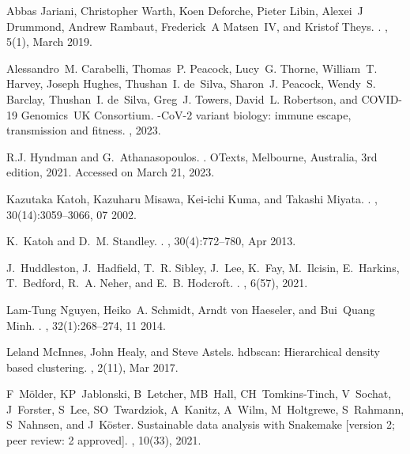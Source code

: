 \documentclass[webpdf,contemporary,large,single]{oup-authoring-template}%
\theoremstyle{thmstyleone}%
\theoremstyle{thmstyletwo}%
\theoremstyle{thmstylethree}%
\begin{document}
\begin{thebibliography}{10}
Abbas Jariani, Christopher Warth, Koen Deforche, Pieter Libin, Alexei~J
  Drummond, Andrew Rambaut, Frederick~A Matsen~IV, and Kristof Theys.
.
, 5(1), March 2019.

Alessandro~M. Carabelli, Thomas~P. Peacock, Lucy~G. Thorne, William~T. Harvey,
  Joseph Hughes, Thushan~I. de~Silva, Sharon~J. Peacock, Wendy~S. Barclay,
  Thushan~I. de~Silva, Greg~J. Towers, David~L. Robertson, and COVID-19
  Genomics~UK Consortium.
-{C}o{V}-2 variant biology: immune escape, transmission and
  fitness.
, 2023.

R.J. Hyndman and G.~Athanasopoulos.
.
\newblock OTexts, Melbourne, Australia, 3rd edition, 2021.
\newblock Accessed on March 21, 2023.

Kazutaka Katoh, Kazuharu Misawa, Kei‐ichi Kuma, and Takashi Miyata.
.
, 30(14):3059--3066, 07 2002.

K.~Katoh and D.~M. Standley.
.
, 30(4):772--780, Apr 2013.

J.~Huddleston, J.~Hadfield, T.~R. Sibley, J.~Lee, K.~Fay, M.~Ilcisin,
  E.~Harkins, T.~Bedford, R.~A. Neher, and E.~B. Hodcroft.
.
, 6(57), 2021.

Lam-Tung Nguyen, Heiko~A. Schmidt, Arndt von Haeseler, and Bui~Quang Minh.
.
, 32(1):268--274, 11 2014.

Leland McInnes, John Healy, and Steve Astels.
\newblock hdbscan: {H}ierarchical density based clustering.
, 2(11), Mar 2017.

F~M\"{o}lder, KP~Jablonski, B~Letcher, MB~Hall, CH~Tomkins-Tinch, V~Sochat,
  J~Forster, S~Lee, SO~Twardziok, A~Kanitz, A~Wilm, M~Holtgrewe, S~Rahmann,
  S~Nahnsen, and J~K\"{o}ster.
\newblock Sustainable data analysis with {Snakemake} [version 2; peer review: 2
  approved].
, 10(33), 2021.

\end{thebibliography}
\end{document}

